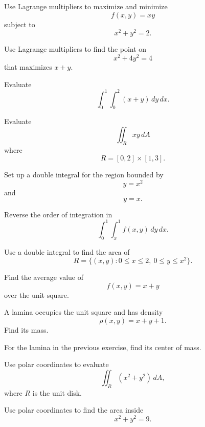 \begin{exercise}[2]
Use Lagrange multipliers to maximize and minimize
\[ f(x,y)=xy \]
subject to
\[ x^2+y^2=2. \]
\end{exercise}

\begin{exercise}[3]
Use Lagrange multipliers to find the point on
\[ x^2+4y^2=4 \]
that maximizes \(x+y\).
\end{exercise}

\begin{exercise}[1]
Evaluate
\[ \int_0^1\int_0^2(x+y)\,dy\,dx. \]
\end{exercise}

\begin{exercise}[2]
Evaluate
\[ \iint_Rxy\,dA \]
where
\[ R=[0,2]\times[1,3]. \]
\end{exercise}

\begin{exercise}[2]
Set up a double integral for the region bounded by
\[ y=x^2 \]
and
\[ y=x. \]
\end{exercise}

\begin{exercise}[2]
Reverse the order of integration in
\[ \int_0^1\int_x^1 f(x,y)\,dy\,dx. \]
\end{exercise}

\begin{exercise}[2]
Use a double integral to find the area of
\[ R=\{(x,y):0\leq x\leq2,\ 0\leq y\leq x^2\}. \]
\end{exercise}

\begin{exercise}[2]
Find the average value of
\[ f(x,y)=x+y \]
over the unit square.
\end{exercise}

\begin{exercise}[2]
A lamina occupies the unit square and has density
\[ \rho(x,y)=x+y+1. \]
Find its mass.
\end{exercise}

\begin{exercise}[3]
For the lamina in the previous exercise, find its center of mass.
\end{exercise}

\begin{exercise}[2]
Use polar coordinates to evaluate
\[ \iint_R(x^2+y^2)\,dA, \]
where \(R\) is the unit disk.
\end{exercise}

\begin{exercise}[2]
Use polar coordinates to find the area inside
\[ x^2+y^2=9. \]
\end{exercise}

